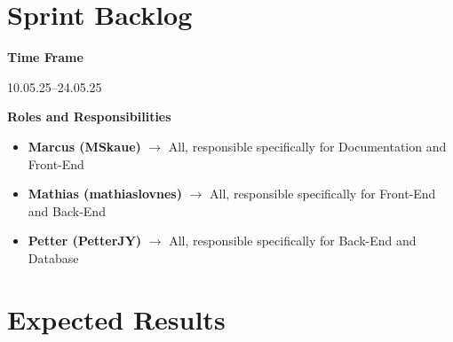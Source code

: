 \documentclass[a4paper,12pt]{article}
\begin{document}
\section*{Sprint Backlog}

\textbf{Time Frame}

10.05.25--24.05.25

\textbf{Roles and Responsibilities}

\begin{itemize}
    \item \textbf{Marcus (MSkaue)} $\rightarrow$ All, responsible specifically for Documentation and Front-End
    \item \textbf{Mathias (mathiaslovnes)} $\rightarrow$ All, responsible specifically for Front-End and Back-End
    \item \textbf{Petter (PetterJY)} $\rightarrow$ All, responsible specifically for Back-End  and Database
\end{itemize}

\section*{Expected Results}
\end{document}
